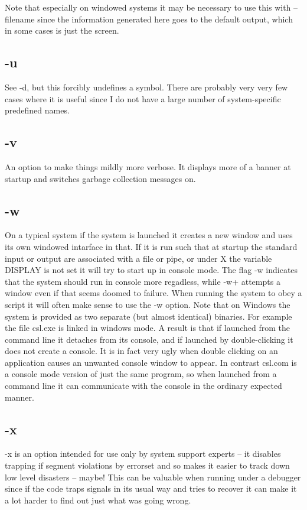 \documentclass[a4paper,11pt]{article}
\begin{document}
Note that especially on windowed systems it may be necessary to use this
with {\ttfamily -- filename} since the information generated here goes to
the default output, which in some cases is just the screen.

\subsection{\ttfamily -u}
See {\ttfamily -d}, but this forcibly undefines a symbol. There are probably
very very few cases where it is useful since I do not have a large
number of system-specific predefined names.

\subsection{\ttfamily -v}
An option to make things mildly more verbose. It displays more of a banner
at startup and switches garbage collection messages on.

\subsection{\ttfamily -w}
On a typical system if the system is launched it creates a new window and uses
its own windowed intarface in that. If it is run such that at startup the
standard input or output are associated with a file or pipe, or under X the
variable {\ttfamily DISPLAY} is not set it will try to start up in console
mode. The flag {\ttfamily -w} indicates that the system should run in console
more regadless, while {\ttfamily -w+} attempts a window even if that seems
doomed to failure. When running the system to obey a script it will often make
sense to use the {\ttfamily -w} option. Note that on Windows the system is
provided as two separate (but almost identical) binaries. For example the
file {\ttfamily csl.exe} is linked in windows mode. A result is that if
launched from the command line it detaches from its console, and if launched
by double-clicking it does not create a console. It is in fact very ugly when
double clicking on an application causes an unwanted console window to appear.
In contrast {\ttfamily csl.com} is a console mode version of just the same
program, so when launched from a command line it can communicate with the
console in the ordinary expected manner.

\subsection{\ttfamily -x}
{\ttfamily -x} is an option intended for use only by system
support experts -- it disables trapping if segment violations by
errorset and so makes it easier to track down low level disasters --
maybe!  This can be valuable when running under a debugger since if the
code traps signals in its usual way and tries to recover it can make it a lot
harder to find out just what was going wrong.
\end{document}
